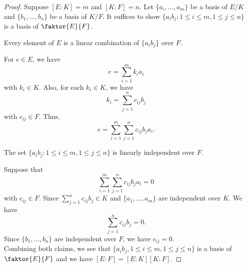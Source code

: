 \documentclass[11pt]{article}
\newcommand{\quotient}[2]{\faktor{#1}{#2}}
\begin{document}
\begin{proof}
Suppose $[E:K]=m$ and $[K:F] = n$. Let $\{a_i,\dots,a_m\}$ be a basis of
$E/K$ and $\{b_1, \dots, b_n\}$ be a basis of $K/F$. It suffices to show
$\{a_ib_j:1 \leq i \leq m, 1 \leq j \leq n\}$ is a basis of $\quotient{E}{F}$.\\

\begin{claim}
Every element of $E$ is a linear combination of $\{a_ib_j\}$ over $F$.
\end{claim}

For $e \in E$, we have
\begin{equation*}
e = \sum^m_{i=1} k_ia_i 
\end{equation*}
with $k_i \in K$. Also, for each $k_i \in K$, we have
\begin{equation*}
k_i = \sum^n_{j=1} c_{ij}b_j 
\end{equation*}
with $c_{ij} \in F$. Thus,
\begin{equation*}
e = \sum^m_{i=1} \sum^n_{j=1} c_{ij}b_ja_i.
\end{equation*}

\begin{claim}
The set $\{a_ib_j:1\leq i\leq m,1\leq j\leq n\}$ is linearly independent
over $F$.
\end{claim}
Suppose that $$\sum_{i=1}^m\sum_{j=1}^nc_{ij}b_ja_i=0$$ with $c_{ij}\in F$.
Since $\sum_{j=1}^nc_{ij}b_j\in K$ and $\{a_1,\dots,a_m\}$ are independent over
$K$. We have $$\sum_{j=1}^nc_{ij}b_j=0.$$ Since $\{b_1,\dots,b_n\}$ are
independent over $F$, we have $c_{ij}=0$.\\

Combining both claims, we see that $\{a_ib_j,1\leq i\leq m,1\leq j\leq n\}$ is a
basis of $\quotient{E}{F}$ and we have $[E:F]=[E:K][K:F]$.
\end{proof}
\end{document}
